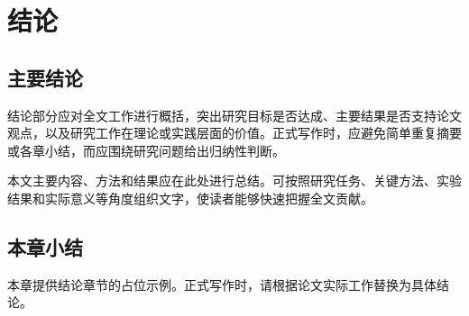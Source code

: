 
\section{结论}

\subsection{主要结论}
\thesisbodyfont
结论部分应对全文工作进行概括，突出研究目标是否达成、主要结果是否支持论文观点，以及研究工作在理论或实践层面的价值。正式写作时，应避免简单重复摘要或各章小结，而应围绕研究问题给出归纳性判断。\par
本文主要内容、方法和结果应在此处进行总结。可按照研究任务、关键方法、实验结果和实际意义等角度组织文字，使读者能够快速把握全文贡献。

\subsection{本章小结}
\thesisbodyfont
本章提供结论章节的占位示例。正式写作时，请根据论文实际工作替换为具体结论。
